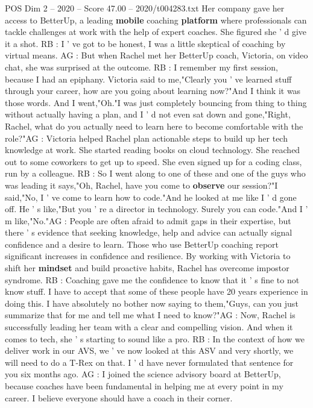 \begin{textsample}{POS Dim 2 – 2020 – Score 47.00 – 2020/t004283.txt}
Her company gave her access to BetterUp, a leading \textbf{mobile} coaching \textbf{platform} where professionals can tackle challenges at work with the help of expert coaches.
She figured she ' d give it a shot.
RB : I ' ve got to be honest, I was a little skeptical of coaching by virtual means.
AG : But when Rachel met her BetterUp coach, Victoria, on video chat, she was surprised at the outcome.
RB : I remember my first session, because I had an epiphany.
Victoria said to me,"Clearly you ' ve learned stuff through your career, how are you going about learning now?"And I think it was those words.
And I went,"Oh."I was just completely bouncing from thing to thing without actually having a plan, and I ' d not even sat down and gone,"Right, Rachel, what do you actually need to learn here to become comfortable with the role?"AG : Victoria helped Rachel plan actionable steps to build up her tech knowledge at work.
She started reading books on cloud technology.
She reached out to some coworkers to get up to speed.
She even signed up for a coding class, run by a colleague.
RB : So I went along to one of these and one of the guys who was leading it says,"Oh, Rachel, have you come to \textbf{observe} our session?"I said,"No, I ' ve come to learn how to code."And he looked at me like I ' d gone off.
He ' s like,"But you ' re a director in technology.
Surely you can code."And I ' m like,"No."AG : People are often afraid to admit gaps in their expertise, but there ' s evidence that seeking knowledge, help and advice can actually signal confidence and a desire to learn.
Those who use BetterUp coaching report significant increases in confidence and resilience.
By working with Victoria to shift her \textbf{mindset} and build proactive habits, Rachel has overcome impostor syndrome.
RB : Coaching gave me the confidence to know that it ' s fine to not know stuff.
I have to accept that some of these people have 20 years experience in doing this.
I have absolutely no bother now saying to them,"Guys, can you just summarize that for me and tell me what I need to know?"AG : Now, Rachel is successfully leading her team with a clear and compelling vision.
And when it comes to tech, she ' s starting to sound like a pro.
RB : In the context of how we deliver work in our AVS, we ' ve now looked at this ASV and very shortly, we will need to do a T-Rex on that.
I ' d have never formulated that sentence for you six months ago.
AG : I joined the science advisory board at BetterUp, because coaches have been fundamental in helping me at every point in my career.
I believe everyone should have a coach in their corner.

\end{textsample}
